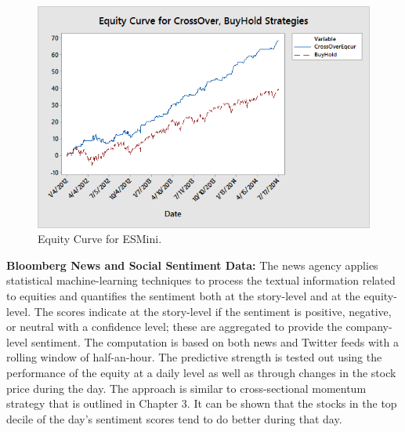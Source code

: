         \begin{figure}[!ht]
        \centering
        \includegraphics[width=\textwidth]{chapters/chapter_news_an/figures/ch4sec4equitycross} 
        \caption{Equity Curve for ESMini. \label{fig:equitycross}}
        \end{figure}

\noindent \textbf{Bloomberg News and Social Sentiment Data:} The news agency applies statistical machine-learning techniques to process the textual information related to equities and quantifies the sentiment both at the story-level and at the equity-level. The scores indicate at the story-level if the sentiment is positive, negative, or neutral with a confidence level; these are aggregated to provide the company-level sentiment. The computation is based on both news and Twitter feeds with a rolling window of half-an-hour. The predictive strength is tested out using the performance of the equity at a daily level as well as through changes in the stock price during the day. The approach is similar to cross-sectional momentum strategy that is outlined in Chapter 3. It can be shown that the stocks in the top decile of the day's sentiment scores tend to do better during that day. 


